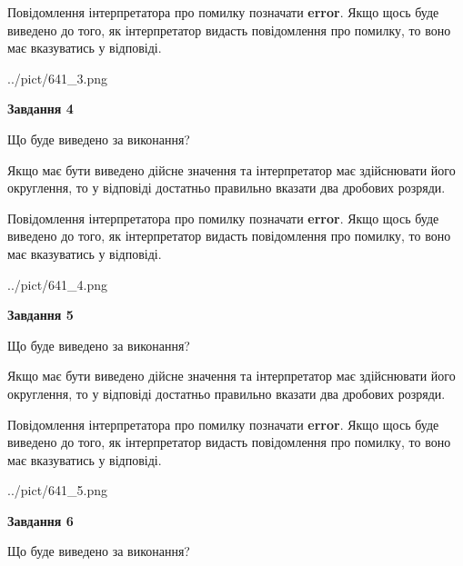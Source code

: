 \documentclass[12pt, ukrainian]{article}
\begin{document}
{\begin {Large}
Повідомлення інтерпретатора про помилку позначати \textbf{error}.
Якщо щось буде виведено до того, як інтерпретатор видасть повідомлення про помилку, 
то воно має вказуватись у відповіді. \par

\begin{center}
	{../pict/641_3.png}
\end{center}
\newpage

{\begin {center}\textbf{Завдання 4}\end {center}}\par
Що буде виведено за виконання? \par

Якщо має бути виведено дійсне значення та інтерпретатор має здійснювати його округлення, 
то у відповіді достатньо правильно вказати два дробових розряди.

Повідомлення інтерпретатора про помилку позначати \textbf{error}.
Якщо щось буде виведено до того, як інтерпретатор видасть повідомлення про помилку, 
то воно має вказуватись у відповіді. \par

\begin{center}
	{../pict/641_4.png}
\end{center}
\newpage

{\begin {center}\textbf{Завдання 5}\end {center}}\par
Що буде виведено за виконання? \par

Якщо має бути виведено дійсне значення та інтерпретатор має здійснювати його округлення, 
то у відповіді достатньо правильно вказати два дробових розряди.

Повідомлення інтерпретатора про помилку позначати \textbf{error}.
Якщо щось буде виведено до того, як інтерпретатор видасть повідомлення про помилку, 
то воно має вказуватись у відповіді. \par

\begin{center}
	{../pict/641_5.png}
\end{center}
\newpage

{\begin {center}\textbf{Завдання 6}\end {center}}\par
Що буде виведено за виконання? \par


\end{Large}}
\end{document}
